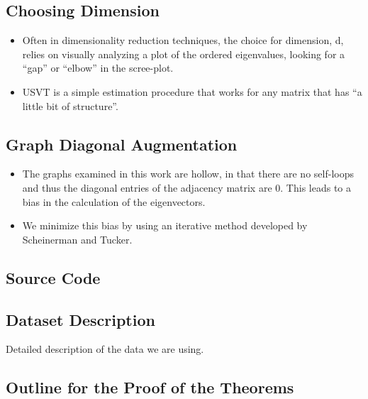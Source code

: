 \documentclass[a4paper]{article}
\begin{document}
\subsection{Choosing Dimension}
\begin{itemize}
\item Often in dimensionality reduction techniques, the choice for dimension, d, relies on visually analyzing a plot of the ordered eigenvalues, looking for a ``gap'' or ``elbow'' in the scree-plot.
\item USVT is a simple estimation procedure that works for any matrix that has ``a little bit of structure''.
\end{itemize}

\subsection{Graph Diagonal Augmentation}
\begin{itemize}
\item The graphs examined in this work are hollow, in that there are no self-loops and thus the diagonal entries of the adjacency matrix are 0. This leads to a bias in the calculation of the eigenvectors.
\item We minimize this bias by using an iterative method developed by Scheinerman and Tucker.
\end{itemize}

\subsection{Source Code}

\subsection{Dataset Description}
Detailed description of the data we are using.

\subsection{Outline for the Proof of the Theorems}
\end{document}

